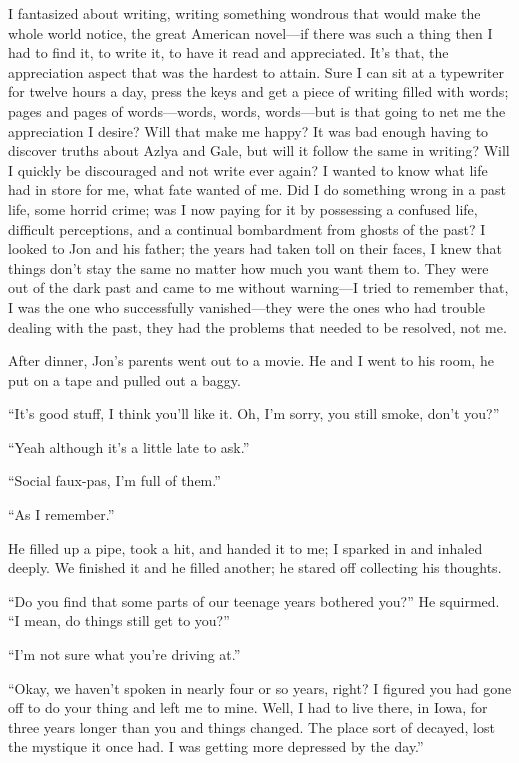 I fantasized about writing, writing something wondrous that would make
the whole world notice, the great American novel---if there was such a
thing then I had to find it, to write it, to have it read and
appreciated. It's that, the appreciation aspect that was the hardest to
attain. Sure I can sit at a typewriter for twelve hours a day, press the
keys and get a piece of writing filled with words; pages and pages of
words---words, words, words---but is that going to net me the
appreciation I desire? Will that make me happy? It was bad enough having
to discover truths about Azlya and Gale, but will it follow the same in
writing? Will I quickly be discouraged and not write ever again? I
wanted to know what life had in store for me, what fate wanted of me.
Did I do something wrong in a past life, some horrid crime; was I now
paying for it by possessing a confused life, difficult perceptions, and
a continual bombardment from ghosts of the past? I looked to Jon and his
father; the years had taken toll on their faces, I knew that things
don't stay the same no matter how much you want them to. They were out
of the dark past and came to me without warning---I tried to remember
that, I was the one who successfully vanished---they were the ones who
had trouble dealing with the past, they had the problems that needed to
be resolved, not me.

After dinner, Jon's parents went out to a movie. He and I went to his
room, he put on a tape and pulled out a baggy.

``It's good stuff, I think you'll like it. Oh, I'm sorry, you still
smoke, don't you?''

``Yeah although it's a little late to ask.''

``Social faux-pas, I'm full of them.''

``As I remember.''

He filled up a pipe, took a hit, and handed it to me; I sparked in and
inhaled deeply. We finished it and he filled another; he stared off
collecting his thoughts.

``Do you find that some parts of our teenage years bothered you?'' He
squirmed. ``I mean, do things still get to you?''

``I'm not sure what you're driving at.''

``Okay, we haven't spoken in nearly four or so years, right? I figured
you had gone off to do your thing and left me to mine. Well, I had to
live there, in Iowa, for three years longer than you and things changed.
The place sort of decayed, lost the mystique it once had. I was getting
more depressed by the day.''

